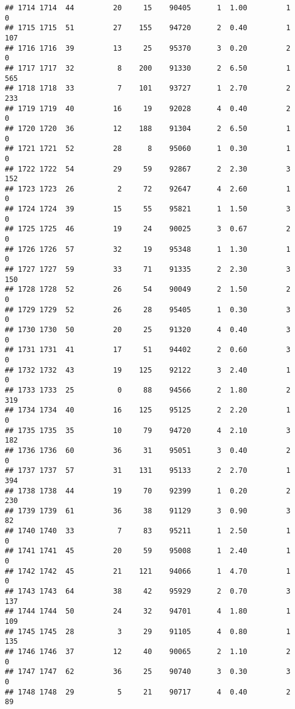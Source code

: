 \documentclass[
]{article}
\begin{document}
\begin{verbatim}
## 1714 1714  44         20     15    90405      1  1.00         1        0
## 1715 1715  51         27    155    94720      2  0.40         1      107
## 1716 1716  39         13     25    95370      3  0.20         2        0
## 1717 1717  32          8    200    91330      2  6.50         1      565
## 1718 1718  33          7    101    93727      1  2.70         2      233
## 1719 1719  40         16     19    92028      4  0.40         2        0
## 1720 1720  36         12    188    91304      2  6.50         1        0
## 1721 1721  52         28      8    95060      1  0.30         1        0
## 1722 1722  54         29     59    92867      2  2.30         3      152
## 1723 1723  26          2     72    92647      4  2.60         1        0
## 1724 1724  39         15     55    95821      1  1.50         3        0
## 1725 1725  46         19     24    90025      3  0.67         2        0
## 1726 1726  57         32     19    95348      1  1.30         1        0
## 1727 1727  59         33     71    91335      2  2.30         3      150
## 1728 1728  52         26     54    90049      2  1.50         2        0
## 1729 1729  52         26     28    95405      1  0.30         3        0
## 1730 1730  50         20     25    91320      4  0.40         3        0
## 1731 1731  41         17     51    94402      2  0.60         3        0
## 1732 1732  43         19    125    92122      3  2.40         1        0
## 1733 1733  25          0     88    94566      2  1.80         2      319
## 1734 1734  40         16    125    95125      2  2.20         1        0
## 1735 1735  35         10     79    94720      4  2.10         3      182
## 1736 1736  60         36     31    95051      3  0.40         2        0
## 1737 1737  57         31    131    95133      2  2.70         1      394
## 1738 1738  44         19     70    92399      1  0.20         2      230
## 1739 1739  61         36     38    91129      3  0.90         3       82
## 1740 1740  33          7     83    95211      1  2.50         1        0
## 1741 1741  45         20     59    95008      1  2.40         1        0
## 1742 1742  45         21    121    94066      1  4.70         1        0
## 1743 1743  64         38     42    95929      2  0.70         3      137
## 1744 1744  50         24     32    94701      4  1.80         1      109
## 1745 1745  28          3     29    91105      4  0.80         1      135
## 1746 1746  37         12     40    90065      2  1.10         2        0
## 1747 1747  62         36     25    90740      3  0.30         3        0
## 1748 1748  29          5     21    90717      4  0.40         2       89

\end{verbatim}
\end{document}
